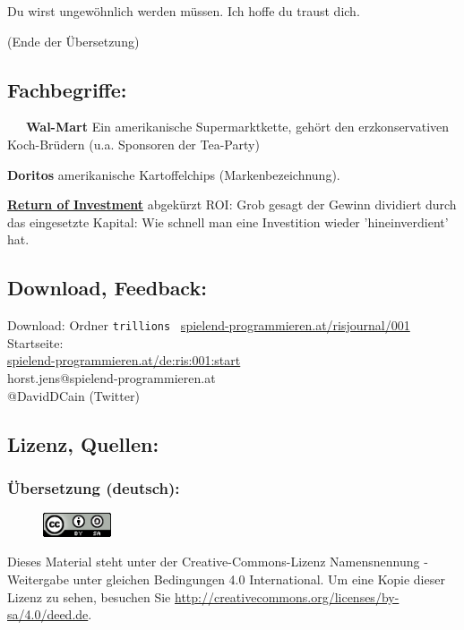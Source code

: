 Du wirst ungewöhnlich werden müssen. Ich hoffe du traust dich.


(Ende der Übersetzung)

\subsection*{Fachbegriffe:}

~~~\textbf{Wal-Mart} Ein amerikanische Supermarktkette, gehört den erzkonservativen Koch-Brüdern (u.a. Sponsoren der Tea-Party)

\textbf{Doritos} amerikanische Kartoffelchips (Markenbezeichnung). 

\href{https://de.wikipedia.org/wiki/Return_on_Investment}{\textbf{Return of Investment}} abgekürzt ROI: Grob gesagt der Gewinn dividiert durch das eingesetzte Kapital: Wie schnell man eine Investition wieder 'hineinverdient' hat. 

\subsection*{Download, Feedback:}
\footnotesize{
Download: Ordner \texttt{trillions} \Mundus\ \href{http://spielend-programmieren.at/risjournal/001}{spielend-programmieren.at/risjournal/001}\\
Startseite:\\
\href{http://spielend-programmieren.at/de:ris:001:start}{spielend-programmieren.at/de:ris:001:start}\\ 
\Letter\: horst.jens@spielend-programmieren.at\\
\Letter\: @DavidDCain (Twitter)\\}
\normalsize 

\subsection*{Lizenz, Quellen:}

\subsubsection*{Übersetzung (deutsch):}

\begin{figure}
\includegraphics[width=2cm]{trillions/ccbysa88x31.png}
\end{figure}
Dieses Material steht unter der Creative-Commons-Lizenz Namensnennung - Weitergabe unter gleichen Bedingungen 4.0 International. Um eine Kopie dieser Lizenz zu sehen, besuchen Sie \url{http://creativecommons.org/licenses/by-sa/4.0/deed.de}.

